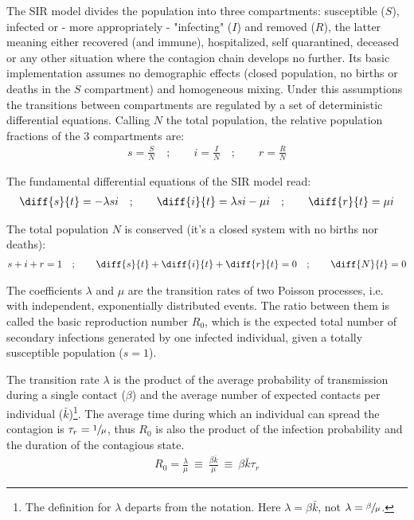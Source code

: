 \documentclass[DIV=12, BCOR=0pt]{scrartcl}  %
\begin{document}
  The SIR model divides the population into three compartments: susceptible ($S$), infected or - more appropriately - "infecting" ($I$) and removed ($R$), the latter meaning either recovered (and immune), hospitalized, self quarantined, deceased or any other situation where the contagion chain develops no further. Its basic implementation assumes no demographic effects (closed population, no births or deaths in the $S$ compartment) and homogeneous mixing. Under this assumptions the transitions between compartments are regulated by a set of deterministic differential equations. %
  Calling $N$ the total population, the relative population fractions of the 3 compartments are:
  \begin{align}
			s = \frac{S}{N}  \quad;  \qquad 	 i = \frac{I}{N}  \quad;  \qquad 	 r = \frac{R}{N}
  \end{align}

  The fundamental differential equations of the SIR model read:
  \begin{align}
  	\diff{s}{t} = - \lambda s i \quad;  \qquad 	\diff{i}{t} = \lambda s i - \mu i \quad; \qquad  \diff{r}{t} = \mu i
  	\label{eq:sir}
  \end{align}

  The total population $N$ is conserved (it's a closed system with no births nor deaths):  
  \begin{align}
  	s + i + r = 1 \quad ; \qquad \diff{s}{t} + \diff{i}{t} + \diff{r}{t} = 0  \quad ; \qquad  \diff{N}{t}= 0
  	\label{eq:sir_sum}
  \end{align}

	The coefficients $\lambda$ and $\mu$ are the transition rates of two Poisson processes, i.e. with independent, exponentially distributed events. The ratio between them is called the basic reproduction number $R_0$, which is the expected total number of secondary infections generated by one infected individual, given a totally susceptible population ($s=1$). 
	
	The transition rate $\lambda$ is the product of the average probability of transmission during a single contact ($\beta$) and the average number of expected contacts per individual ($\bar{k}$)\footnote{The definition for $\lambda$ departs from the \citet{PastorSatorras} notation. Here $\lambda = \beta \bar{k}$, not $\lambda = \sfrac{\beta}{\mu}$.}.
  The average time during which an individual can spread the contagion is $\tau_{r} = \sfrac{1}{\mu}$, thus $R_0$ is also the product of the infection probability and the duration of the contagious state. 
  \begin{align}
			R_0 = \frac{\lambda}{\mu} \ \equiv \ \frac{\beta \bar{k}}{\mu} \ \equiv \ \beta \bar{k} \tau_{r}
			\label{eq:R0}
  \end{align}
\end{document}
